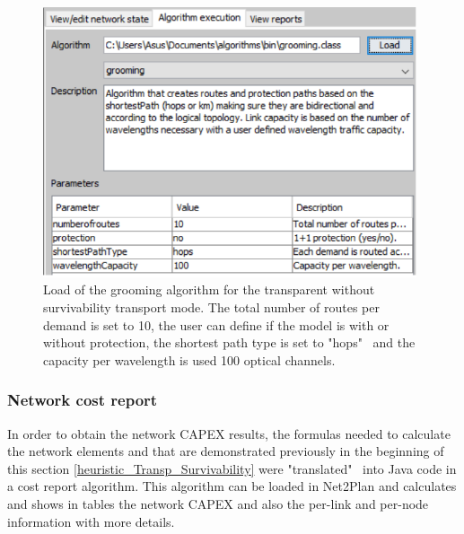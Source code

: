 \begin{figure}[H]
\centering
\includegraphics[width=11cm]{sdf/heuristic/transparent/figures/grooming_transparent_surv4}
\caption{Load of the grooming algorithm for the transparent without survivability transport mode. The total number of routes per demand is set to 10, the user can define if the model is with or without protection, the shortest path type is set to "hops" \ and the capacity per wavelength is used 100 optical channels.}
\label{grooming_transparent_surv4}
\end{figure}

\newpage
\subsubsection{Network cost report}

\vspace{11pt}
In order to obtain the network CAPEX results, the formulas needed to calculate the network elements and that are demonstrated previously in the beginning of this section \ref{heuristic_Transp_Survivability} were "translated" \ into Java code in a cost report algorithm. This algorithm can be loaded in Net2Plan and calculates and shows in tables the network CAPEX and also the per-link and per-node information with more details.

